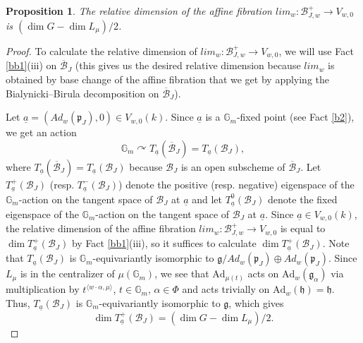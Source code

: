 \documentclass{amsart}
\newcommand{\ca}{\underline{a}}
\newcommand{\gm}{\mathbb{G}_{m}}
\newcommand{\clz}{lim_{w}}
\theoremstyle{plain}
\newtheorem{proposition}{Proposition}[section]
\theoremstyle{definition}
\theoremstyle{remark}
\begin{document}
\begin{proposition}\label{relative dimension of lim}
The relative dimension of the affine fibration $lim_{w}:\mathcal{B}_{J,w}^{+}\rightarrow V_{w,0}$ is $(\dim G-\dim L_{\mu})/2$.
\end{proposition}
\begin{proof}
To calculate the relative dimension of $\clz:\mathcal{B}_{J,w}^{+}\rightarrow V_{w,0}$, we will use Fact \ref{bb1}(iii) on $\overline{\mathcal{B}}_{J}$ (this gives us the desired relative dimension because 
$\clz$ is obtained by base change of the affine fibration that we get by applying the Bialynicki--Birula decomposition on $\overline{\mathcal{B}}_{J}$). 

Let $\underline{a}=(Ad_{w}(\mathfrak{p}_{J}),0)\in V_{w,0}(k)$.
Since $\underline{a}$ is a $\mathbb{G}_{m}$-fixed point (see Fact \ref{b2}), we get an action %
\[
\mathbb{G}_{m}\curvearrowright T_{\ca}(\overline{\mathcal{B}}_{J})=T_{\ca}(\mathcal{B}_{J}),
\]
where $T_{\ca}(\overline{\mathcal{B}}_{J})=T_{\ca}(\mathcal{B}_{J})$ because $\mathcal{B}_{J}$ is an open subscheme of $\overline{\mathcal{B}}_{J}$. 
Let $T_{\ca}^{+}(\mathcal{B}_{J})$ (resp. $T_{\ca}^{-}(\mathcal{B}_{J})$) denote the positive (resp. negative) eigenspace of the $\gm$-action on the tangent space of $\mathcal{B}_{J}$ at $\ca$ and let $T_{\ca}^{0}(\mathcal{B}_{J})$ denote the fixed eigenspace of the $\gm$-action on the tangent space of $\mathcal{B}_{J}$ at $\ca$.
Since $\underline{a}\in V_{w,0}(k)$, the relative dimension of the affine fibration $lim_{w}:\mathcal{B}_{J,w}^{+}\rightarrow V_{w,0}$ is equal to $\dim T_{\ca}^{+}(\mathcal{B}_{J})$ by Fact \ref{bb1}(iii), so it suffices to
calculate $\dim T_{\ca}^{+}(\mathcal{B}_{J})$.
Note that $T_{\ca}(\mathcal{B}_{J})$ is $\gm$-equivariantly isomorphic to 
$\mathfrak{g}/Ad_{w}(\mathfrak{p}_{J})\oplus Ad_{w}(\mathfrak{p}_{J})$. Since $L_{\mu}$ is in the centralizer of $\mu(\gm)$, we see that $\text{Ad}_{\mu(t)}$ acts on $\text{Ad}_{w}(\mathfrak{g}_{\alpha})$ via multiplication by $t^{\langle w\cdot\alpha,\mu\rangle}$,
$t\in\gm$, $\alpha\in\Phi$
and 
acts trivially on $\text{Ad}_{w}(\mathfrak{h})=\mathfrak{h}$. Thus, $T_{\ca}(\mathcal{B}_{J})$ is $\gm$-equivariantly isomorphic to $\mathfrak{g}$, which gives
\[
\dim T_{\ca}^{+}(\mathcal{B}_{J})
=(\dim G-\dim L_{\mu})/2.
\]
\end{proof}
\end{document}
